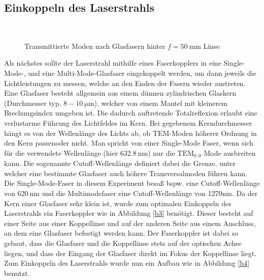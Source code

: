 \documentclass[11pt,a4paper,oneside]{scrartcl}
\begin{document}
\subsection{Einkoppeln des Laserstrahls}
\begin{figure}[H]
\setcounter{figure}{5}
    \centering
  \\
   \caption{Transmittierte Moden nach Glasfasern hinter $f=50\ \mathrm{mm}$ Linse}
    \label{FotostreckeGlasfasern}
\end{figure}
Als nächstes sollte der Laserstrahl mithilfe eines Faserkopplers in eine Single-Mode-, und eine Multi-Mode-Glasfaser eingekoppelt werden, um dann jeweils die Lichtleistungen zu messen, welche an den Enden der
Fasern wieder austreten. Eine Glasfaser besteht allgemein aus einem dünnen zylindrischen Glaskern (Durchmesser typ. $8-10\ \mathrm{\mu m}$), welcher von einem Mantel mit kleinerem Brechungsindex umgeben ist. Die dadurch
auftretende Totalreflexion erlaubt eine verlustarme Führung des Lichtfeldes im Kern. Bei gegebenem Kerndurchmesser hängt es von der Wellenlänge des Lichts ab, ob TEM-Moden höherer Ordnung in den Kern
\glqq passen\Grqq oder nicht. Man spricht von einer Single-Mode Faser, wenn sich für die verwendete Wellenlänge (hier $632.8\ \mathrm{nm}$) nur die $ \mathrm{TEM}_{0,0}$ Mode ausbreiten kann. Die sogenannte Cutoff-Wellenlänge definiert dabei die Grenze,
unter welcher eine bestimmte Glasfaser auch höhere Transversalmoden führen kann. Die Single-Mode-Faser in diesem Experiment besaß bspw. eine Cutoff-Wellenlänge von $620\ \mathrm{nm}$ und die Multimodefaser eine
Cutoff-Wellenlänge von 1270nm. 
\setcounter{imEnv}{6}
Da der Kern einer Glasfaser sehr klein ist, wurde zum optimalen Einkoppeln des Laserstrahls ein Faserkoppler wie in Abbildung \ref{b3} benötigt. Dieser besteht auf einer Seite aus
einer Koppellinse und auf der anderen Seite aus einem Anschluss, an dem eine Glasfaser befestigt werden kann. Der Faserkoppler ist dabei so gebaut, dass die Glasfaser und die Koppellinse stets auf der
optischen Achse liegen, und dass der Eingang der Glasfaser direkt im Fokus der Koppellinse liegt. Zum Einkoppeln des Laserstrahls wurde nun ein Aufbau wie in Abbildung \ref{b4} benutzt. 
\end{document}
